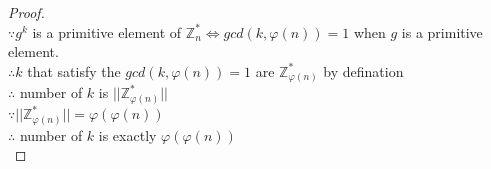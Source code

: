 \documentclass[paper=a4, fontsize=11pt]{scrartcl} %
\numberwithin{equation}{section} %
\numberwithin{figure}{section} %
\newcommand{\pnl}{$ $\newline\\}
\newcommand{\Z}{\mathbb{Z}}
\begin{document}
\begin{enumerate}
\begin{proof}
\pnl
$\because g^k$ is a primitive element of $\Z^*_n \iff gcd(k, \varphi(n)) = 1$ when $g$ is a primitive element.\\
$\therefore k$ that satisfy the $gcd(k, \varphi(n)) = 1$ are $\Z^*_{\varphi(n)}$ by defination\\
$\therefore$ number of $k$ is $||\Z^*_{\varphi(n)}||$\\
$\because ||\Z^*_{\varphi(n)}|| = \varphi(\varphi(n))$\\
$\therefore$ number of $k$ is exactly $\varphi(\varphi(n))$\\
\end{proof}
\end{enumerate}

\end{document}

